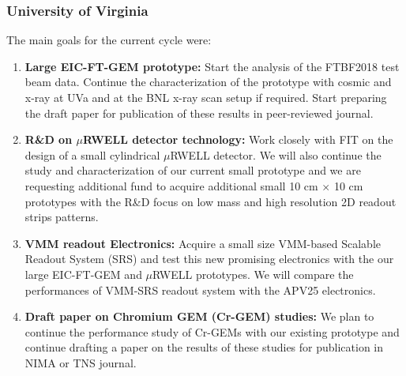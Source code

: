 \subsubsection{University of Virginia} 
The main goals for the current cycle were:

%
\begin{enumerate}
\item \textbf{Large EIC-FT-GEM prototype:} Start the analysis of the FTBF2018 test beam  data. Continue the characterization of the prototype with cosmic and x-ray at UVa and at the BNL x-ray scan setup if required.  Start preparing the draft paper for publication of these results in peer-reviewed journal. 
%
\item \textbf{R\&D on $\mu$RWELL detector technology:} Work closely with FIT on the design of a small cylindrical  $\mu$RWELL detector. We will also continue the study and characterization of our current small prototype and we are requesting additional fund to acquire additional small  10 cm $\times$ 10 cm prototypes with the R\&D focus on low mass and high resolution 2D readout strips patterns.
%
\item \textbf{VMM readout Electronics:} Acquire a small size VMM-based Scalable Readout System (SRS) and test this new promising electronics with the our large EIC-FT-GEM and  $\mu$RWELL prototypes. We will compare the performances of VMM-SRS readout system with the APV25 electronics.
%
\item \textbf{Draft paper on Chromium GEM (Cr-GEM) studies:} We plan to continue the performance study of Cr-GEMs with our existing prototype and continue drafting a paper on the results of these studies for publication in NIMA or TNS journal.
\end{enumerate}

